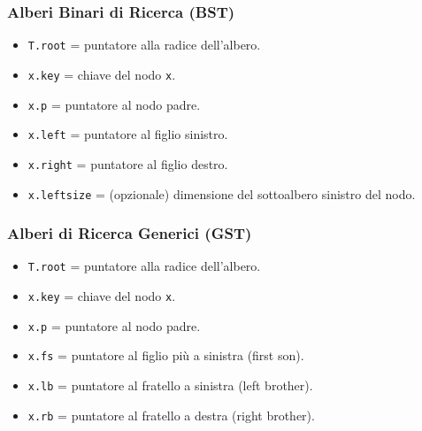 \subsubsection{Alberi Binari di Ricerca (BST)}
\begin{itemize}
    \item \texttt{T.root} = puntatore alla radice dell'albero.
    \item \texttt{x.key} = chiave del nodo \texttt{x}.
    \item \texttt{x.p} = puntatore al nodo padre.
    \item \texttt{x.left} = puntatore al figlio sinistro.
    \item \texttt{x.right} = puntatore al figlio destro.
    \item \texttt{x.leftsize} = (opzionale) dimensione del sottoalbero sinistro del nodo.
\end{itemize}


\subsubsection{Alberi di Ricerca Generici (GST)}
\begin{itemize}
    \item \texttt{T.root} = puntatore alla radice dell'albero.
    \item \texttt{x.key} = chiave del nodo \texttt{x}.
    \item \texttt{x.p} = puntatore al nodo padre.
    \item \texttt{x.fs} = puntatore al figlio più a sinistra (first son).
    \item \texttt{x.lb} = puntatore al fratello a sinistra (left brother).
    \item \texttt{x.rb} = puntatore al fratello a destra (right brother).
\end{itemize}

